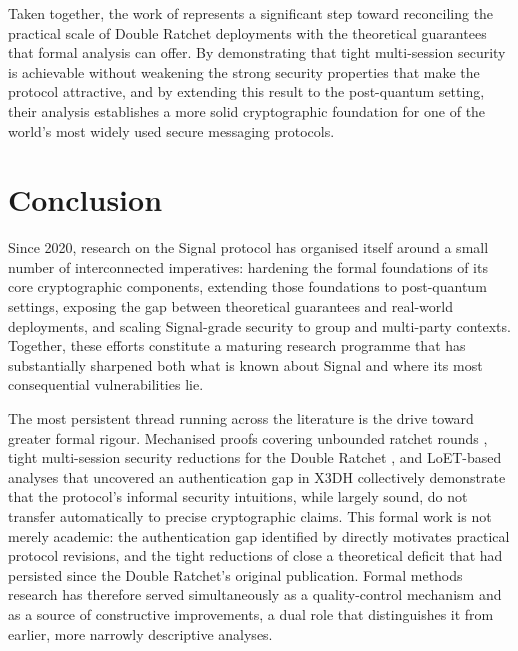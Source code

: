 Taken together, the work of \textcite{collins2024} represents a significant step toward reconciling the practical scale of Double Ratchet deployments with the theoretical guarantees that formal analysis can offer. By demonstrating that tight multi-session security is achievable without weakening the strong security properties that make the protocol attractive, and by extending this result to the post-quantum setting, their analysis establishes a more solid cryptographic foundation for one of the world's most widely used secure messaging protocols.

\section{Conclusion}

Since 2020, research on the Signal protocol has organised itself around a small number of interconnected imperatives: hardening the formal foundations of its core cryptographic components, extending those foundations to post-quantum settings, exposing the gap between theoretical guarantees and real-world deployments, and scaling Signal-grade security to group and multi-party contexts. Together, these efforts constitute a maturing research programme that has substantially sharpened both what is known about Signal and where its most consequential vulnerabilities lie.

The most persistent thread running across the literature is the drive toward greater formal rigour. Mechanised proofs covering unbounded ratchet rounds \parencite{bhargavan2021}, tight multi-session security reductions for the Double Ratchet \parencite{collins2024}, and LoET-based analyses that uncovered an authentication gap in X3DH \parencite{li2024,xiao2025} collectively demonstrate that the protocol's informal security intuitions, while largely sound, do not transfer automatically to precise cryptographic claims. This formal work is not merely academic: the authentication gap identified by \textcite{li2024} directly motivates practical protocol revisions, and the tight reductions of \textcite{collins2024} close a theoretical deficit that had persisted since the Double Ratchet's original publication. Formal methods research has therefore served simultaneously as a quality-control mechanism and as a source of constructive improvements, a dual role that distinguishes it from earlier, more narrowly descriptive analyses.

